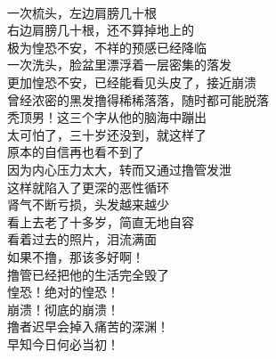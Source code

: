 \begin{poem}[头发撸没了]
    \begin{multicols}{2}
        \begin{center}~\\
            一次梳头，左边肩膀几十根 \\ 右边肩膀几十根，还不算掉地上的 \\ 极为惶恐不安，不祥的预感已经降临 \\ 一次洗头，脸盆里漂浮着一层密集的落发 \\ 更加惶恐不安，已经能看见头皮了，接近崩溃 \\ 曾经浓密的黑发撸得稀稀落落，随时都可能脱落 \\ 秃顶男！这三个字从他的脑海中蹦出 \\ 太可怕了，三十岁还没到，就这样了 \\ 原本的自信再也看不到了 \\ 因为内心压力太大，转而又通过撸管发泄 \\ 这样就陷入了更深的恶性循环 \\ 肾气不断亏损，头发越来越少 \\ 看上去老了十多岁，简直无地自容 \\ 看着过去的照片，泪流满面 \\ 如果不撸，那该多好啊！ \\ 撸管已经把他的生活完全毁了 \\ 惶恐！绝对的惶恐！ \\ 崩溃！彻底的崩溃！ \\ 撸者迟早会掉入痛苦的深渊！ \\ 早知今日何必当初！
        \end{center}
    \end{multicols}
\end{poem}


